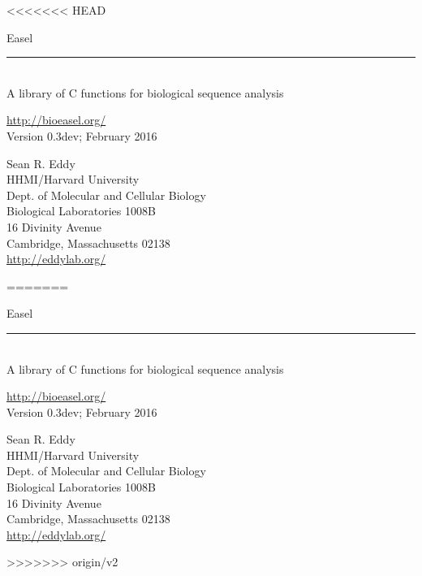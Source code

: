 <<<<<<< HEAD
\begin{titlepage}
{\Large

\vspace*{\fill}

\noindent
{\Huge{Easel}} \\ 
\rule[2pt]{\textwidth}{1pt} \\
\hspace*{\fill} {\large {A library of C functions for
    biological sequence analysis} \\ }

\vspace*{\fill}

\begin{center}
\url{http://bioeasel.org/}\\
Version 0.3dev; February 2016 \\ 

\vspace*{\fill}

Sean R. Eddy\\
HHMI/Harvard University\\
Dept. of Molecular and Cellular Biology\\
Biological Laboratories 1008B\\
16 Divinity Avenue\\
Cambridge, Massachusetts 02138\\
\url{http://eddylab.org/}\\
\end{center}

\vspace*{\fill}
}
\end{titlepage}
=======
\begin{titlepage}
{\Large

\vspace*{\fill}

\noindent
{\Huge{Easel}} \\ 
\rule[2pt]{\textwidth}{1pt} \\
\hspace*{\fill} {\large {A library of C functions for
    biological sequence analysis} \\ }

\vspace*{\fill}

\begin{center}
\url{http://bioeasel.org/}\\
Version 0.3dev; February 2016 \\ 

\vspace*{\fill}

Sean R. Eddy\\
HHMI/Harvard University\\
Dept. of Molecular and Cellular Biology\\
Biological Laboratories 1008B\\
16 Divinity Avenue\\
Cambridge, Massachusetts 02138\\
\url{http://eddylab.org/}\\
\end{center}

\vspace*{\fill}
}
\end{titlepage}
>>>>>>> origin/v2
